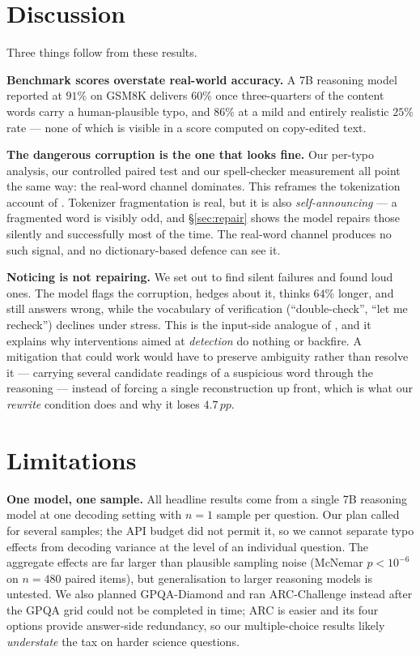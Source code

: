 \documentclass[11pt]{article}
\newcommand{\pp}{\,pp}
\begin{document}
\section{Discussion}
\label{sec:discussion}

Three things follow from these results.

\textbf{Benchmark scores overstate real-world accuracy.} A 7B reasoning model
reported at $91\%$ on GSM8K delivers $60\%$ once three-quarters of the content
words carry a human-plausible typo, and $86\%$ at a mild and entirely realistic
$25\%$ rate --- none of which is visible in a score computed on copy-edited text.

\textbf{The dangerous corruption is the one that looks fine.} Our per-typo
analysis, our controlled paired test and our spell-checker measurement all point
the same way: the real-word channel dominates. This reframes the tokenization
account of \citet{chai2024}. Tokenizer fragmentation is real, but it is also
\emph{self-announcing} --- a fragmented word is visibly odd, and
\S\ref{sec:repair} shows the model repairs those silently and successfully most
of the time. The real-word channel produces no such signal, and no
dictionary-based defence can see it.

\textbf{Noticing is not repairing.} We set out to find silent failures and found
loud ones. The model flags the corruption, hedges about it, thinks $64\%$
longer, and still answers wrong, while the vocabulary of verification
(``double-check'', ``let me recheck'') declines under stress. This is the
input-side analogue of \citet{huang2024}, and it explains why interventions
aimed at \emph{detection} do nothing or backfire. A mitigation that could work
would have to preserve ambiguity rather than resolve it --- carrying several
candidate readings of a suspicious word through the reasoning --- instead of
forcing a single reconstruction up front, which is what our \emph{rewrite}
condition does and why it loses $4.7\pp$.

\section{Limitations}
\label{sec:limitations}

\textbf{One model, one sample.} All headline results come from a single 7B
reasoning model at one decoding setting with $n{=}1$ sample per question. Our
plan called for several samples; the API budget did not permit it, so we cannot
separate typo effects from decoding variance at the level of an individual
question. The aggregate effects are far larger than plausible sampling noise
(McNemar $p<10^{-6}$ on $n{=}480$ paired items), but generalisation to larger
reasoning models is untested. We also planned GPQA-Diamond and ran
ARC-Challenge instead after the GPQA grid could not be completed in time; ARC is
easier and its four options provide answer-side redundancy, so our
multiple-choice results likely \emph{understate} the tax on harder science
questions.
\end{document}
